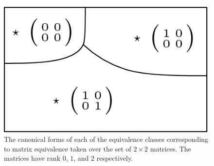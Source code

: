 \documentclass{article}
\begin{document}
        \begin{figure}[H]
            \centering
            \captionsetup{width=.6\linewidth}
            \includegraphics[scale = .4]{sp23/hw-supplements/hw5-supp/images/linalg_2by2_rank_equivalence_classes.png}
            \caption{The canonical forms of each of the equivalence classes corresponding to matrix equivalence taken over the set of $2 \times 2$ matrices. The matrices have rank $0$, $1$, and $2$ respectively.}
            \label{fig:2}
        \end{figure}
\end{document}
